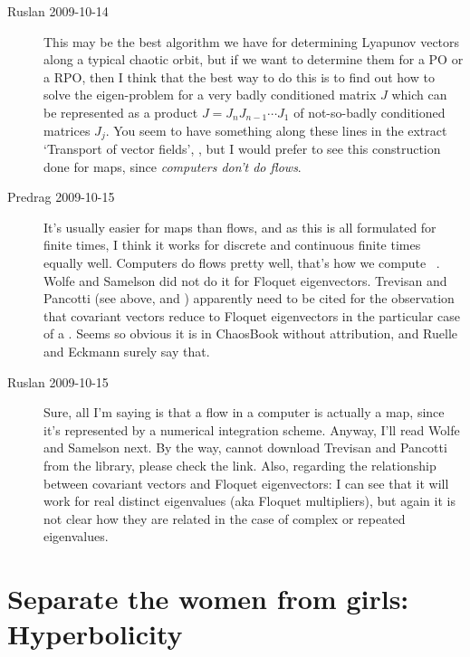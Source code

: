 \begin{description}
  \item[Ruslan 2009-10-14]
 This may be the best
algorithm we have for determining Lyapunov vectors along a
typical chaotic orbit, but if we want to determine them for a
PO or a RPO, then I think that the best way to do this is to
find out how to solve the eigen-problem for a very badly
conditioned matrix $J$ which can be represented as a product
$J = J_{n}J_{n-1}\cdots J_1$ of not-so-badly conditioned
matrices $J_j$.  You seem to have something along these lines
in the extract `Transport of vector fields', , but I
would prefer to see this construction done for maps, since
\emph{computers don't do flows}.


\item[Predrag 2009-10-15]
It's usually easier for maps than flows, and as this is all
formulated for finite times, I think it works for discrete
and continuous finite times equally well. Computers do flows
pretty well, that's how we compute \FloquetM\ \monodromy.
Wolfe and Samelson did not do it for Floquet
eigenvectors. Trevisan and Pancotti (see above, and
) apparently need to be cited for the
observation that covariant vectors reduce to Floquet
eigenvectors in the particular case of a {\po}.
Seems so obvious it is in ChaosBook without attribution, and
Ruelle and Eckmann surely say that.

\item[Ruslan 2009-10-15]
Sure, all I'm saying is that a flow in a computer is actually
a map, since it's represented by a numerical integration
scheme.  Anyway, I'll read Wolfe and Samelson
next.  By the way, cannot download Trevisan and Pancotti from
the library, please check the link.  Also, regarding the
relationship between  covariant vectors and Floquet
eigenvectors: I can see that it will work for real distinct
eigenvalues (aka Floquet multipliers), but again it is not
clear how they are related in the case of complex or repeated
eigenvalues.

\end{description}


\section{Separate the women from girls:
		\\ Hyperbolicity}

